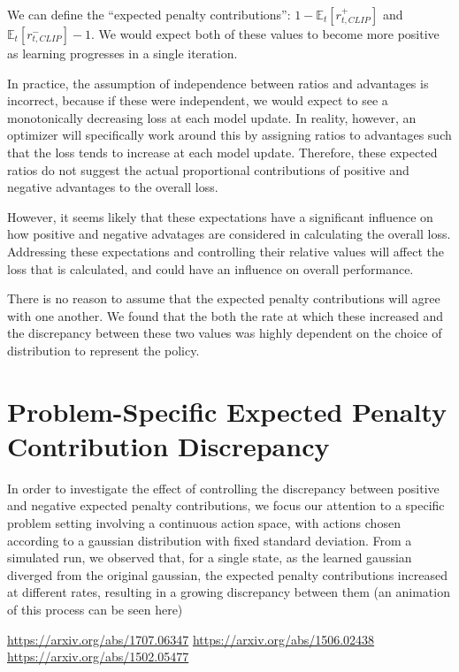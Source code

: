 \documentclass[letterpaper,twocolumn,10pt]{article}
\begin{document}
We can define the ``expected penalty contributions'':
$1 - \mathbb{E}_t[r_{t, CLIP}^+]$ and $\mathbb{E}_t[r_{t, CLIP}^-] - 1$. We
would expect both of these values to become more positive as learning
progresses in a single iteration.

In practice, the assumption of independence between ratios and advantages is
incorrect, because if these were independent, we would expect to see a
monotonically decreasing loss at each model update. In reality, however, an
optimizer will specifically work around this by assigning ratios to advantages
such that the loss tends to increase at each model update. Therefore, these
expected ratios do not suggest the actual proportional contributions of
positive and negative advantages to the overall loss.

However, it seems likely that these expectations have a significant influence
on how positive and negative advatages are considered in calculating the
overall loss. Addressing these expectations and controlling their relative
values will affect the loss that is calculated, and could have an influence on
overall performance.

There is no reason to assume that the expected penalty contributions will agree
with one another. We found that the both the rate at which these increased and
the discrepancy between these two values was highly dependent on the choice of
distribution to represent the policy.

\section{Problem-Specific Expected Penalty Contribution Discrepancy}

In order to investigate the effect of controlling the discrepancy between
positive and negative expected penalty contributions, we focus our attention to
a specific problem setting involving a continuous action space, with actions
chosen according to a gaussian distribution with fixed standard deviation. From
a simulated run, we observed that, for a single state, as the learned gaussian
diverged from the original gaussian, the expected penalty contributions
increased at different rates, resulting in a growing discrepancy between them
(an animation of this process can be seen here)

\theendnotes

\begin{thebibliography}{9}
\url{https://arxiv.org/abs/1707.06347}
\url{https://arxiv.org/abs/1506.02438}
\url{https://arxiv.org/abs/1502.05477}
\end{thebibliography}
\end{document}
